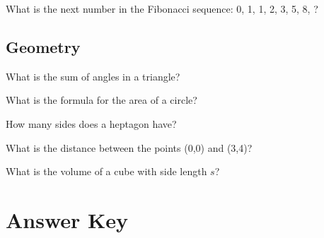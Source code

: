 \documentclass[12pt,a4paper]{book}
\begin{document}
\begin{enhancedmcq}[Sequences]{What is the next number in the Fibonacci sequence: 0, 1, 1, 2, 3, 5, 8, ?}
\end{enhancedmcq}

\section{Geometry}

\begin{enhancedmcq}[Triangles]{What is the sum of angles in a triangle?}
\end{enhancedmcq}

\begin{enhancedmcq}[Circles]{What is the formula for the area of a circle?}
\end{enhancedmcq}

\begin{enhancedmcq}[Polygons]{How many sides does a heptagon have?}
\end{enhancedmcq}

\begin{enhancedmcq}{What is the distance between the points (0,0) and (3,4)?}
\end{enhancedmcq}

\begin{enhancedmcq}{What is the volume of a cube with side length $s$?}
\end{enhancedmcq}

\chapter{Answer Key}
\end{document}
